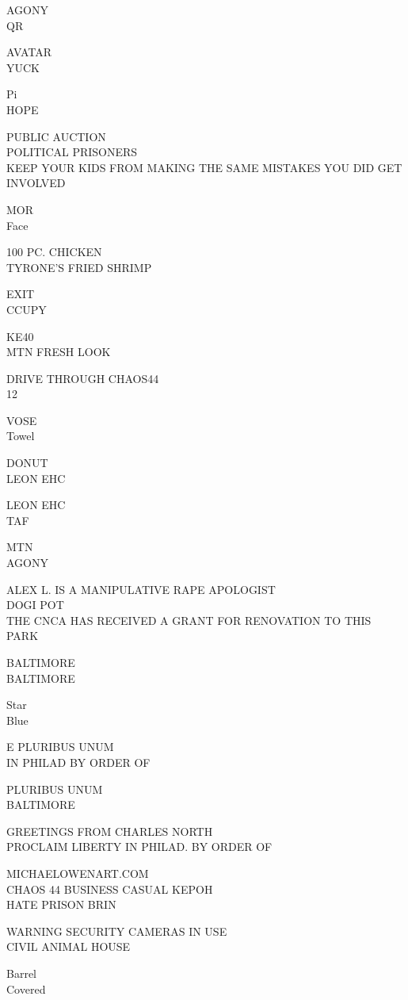 \documentclass[10pt,letterpaper]{article}
\begin{document}
AGONY\\
QR

AVATAR\\
YUCK

Pi\\
HOPE

PUBLIC AUCTION\\
POLITICAL PRISONERS\\
KEEP YOUR KIDS FROM MAKING THE SAME MISTAKES YOU DID GET INVOLVED

MOR\\
Face

100 PC. CHICKEN\\
TYRONE'S FRIED SHRIMP

EXIT\\
CCUPY

KE40\\
MTN FRESH LOOK

DRIVE THROUGH CHAOS44\\
12

VOSE\\
Towel

DONUT\\
LEON EHC

LEON EHC\\
TAF

MTN\\
AGONY

ALEX L. IS A MANIPULATIVE RAPE APOLOGIST\\
DOGI POT\\
THE CNCA HAS RECEIVED A GRANT FOR RENOVATION TO THIS PARK

BALTIMORE\\
BALTIMORE

Star\\
Blue

E PLURIBUS UNUM\\
IN PHILAD BY ORDER OF

PLURIBUS UNUM\\
BALTIMORE

GREETINGS FROM CHARLES NORTH\\
PROCLAIM LIBERTY IN PHILAD. BY ORDER OF

MICHAELOWENART.COM\\
CHAOS 44 BUSINESS CASUAL KEPOH\\
HATE PRISON BRIN

WARNING SECURITY CAMERAS IN USE\\
CIVIL ANIMAL HOUSE

Barrel\\
Covered
\end{document}
